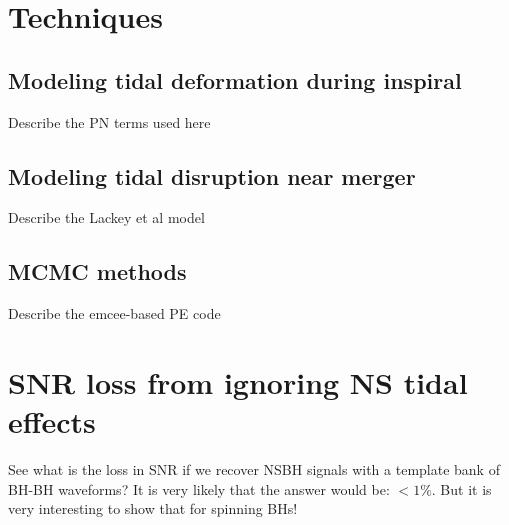 \documentclass[aps,prd,amsmath,floats,floatfix, twocolumn,
superscriptaddress,nofootinbib,showpacs]{revtex4-1}
\begin{document}
\section{Techniques}
\subsection{Modeling tidal deformation during inspiral}
Describe the PN terms used here

\subsection{Modeling tidal disruption near merger}
Describe the Lackey et al model

\subsection{MCMC methods}
Describe the emcee-based PE code

\section{SNR loss from ignoring NS tidal effects}
See what is the loss in SNR if we recover NSBH signals with a template bank of
BH-BH waveforms? It is very likely that the answer would be: $<1\%$. But it
is very interesting to show that for spinning BHs!

\end{document}
